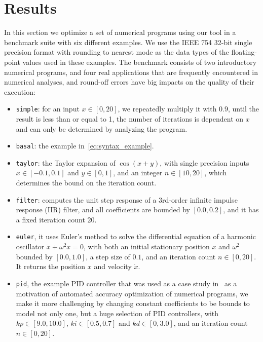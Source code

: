 \section{Results}
\label{sec:results}

In this section we optimize a set of numerical programs using our tool in
a benchmark suite with six different examples.  We use the IEEE 754 32-bit
single precision format with rounding to nearest mode as the data types of the
floating-point values used in these examples.  The benchmark consists of two
introductory numerical programs, and four real applications that are frequently
encountered in numerical analyses, and round-off errors have big impacts on the
quality of their execution:
\begin{itemize}
    \item \texttt{simple}: for an input $x \in [0, 20]$, we repeatedly multiply
it with $0.9$, until the result is less than or equal to 1, the number of
iterations is dependent on $x$ and can only be determined by analyzing the
program.
    \item \texttt{basal}: the example in~\eqref{eq:syntax_example}.
    \item \texttt{taylor}: the Taylor expansion of $\cos(x + y)$, with single
precision inputs $x \in [-0.1, 0.1]$ and $y \in [0, 1]$, and an integer $n \in
[10, 20]$, which determines the bound on the iteration count.
    \item \texttt{filter}: computes the unit step response of a 3rd-order
infinite impulse response (IIR) filter, and all coefficients are bounded by
$[0.0, 0.2]$, and it has a fixed iteration count 20.
    \item \texttt{euler}, it uses Euler's method to solve the differential
equation of a harmonic oscillator $\ddot{x} + \omega^2 x = 0$, with both an
initial stationary position $x$ and $\omega^2$ bounded by $[0.0, 1.0]$, a step
size of $0.1$, and an iteration count $n \in [0, 20]$.  It returns the position
$x$ and velocity $\dot{x}$.
    \item \texttt{pid}, the example PID controller that was used as a case
study in~\cite{damouche14} as a motivation of automated accuracy optimization
of numerical programs, we make it more challenging by changing constant
coefficients to be bounds to model not only one, but a huge selection of PID
controllers, with $kp \in [9.0, 10.0]$, $ki \in [0.5, 0.7]$ and $kd \in [0,
3.0]$, and an iteration count $n \in [0, 20]$.
\end{itemize}

